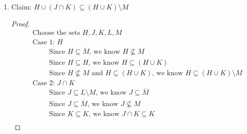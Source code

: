 \documentclass{article}
\begin{document}
\begin{enumerate}
\begin{enumerate}
\begin{proof}
\begin{align*}
                &5. \quad \hspace{1cm} \text{Since } X \nsubseteq Z \text{, we know } X \nsubseteq Y \cap Z \\
                &6. \quad \text{Since } X \nsubseteq Y \cap Z \text{, we know } X \subseteq \overline{Y \cap Z}
            \end{align*}
        \end{proof}
        \item Claim: $H \cup (J \cap K) \subseteq (H \cup K) \setminus M$
        \begin{proof}
            \begin{align}
                &\quad \text{Choose the sets } H, J, K, L, M \\
                &\quad \text{Case 1: } H \\
                &\quad \hspace{1cm} \text{Since } H \subseteq \overline{M} \text{, we know } H \nsubseteq M \\
                &\quad \hspace{1cm} \text{Since } H \subseteq H \text{, we know } H \subseteq (H \cup K) \\
                &\quad \hspace{1cm} \text{Since } H \nsubseteq M \text{ and } H \subseteq (H \cup K) \text{, we know } H \subseteq (H \cup K) \setminus M \\
                &\quad \text{Case 2: } J \cap K \\
                &\quad \hspace{1cm} \text{Since } J \subseteq L \setminus M \text{, we know } J \subseteq \overline{M} \\
                &\quad \hspace{1cm} \text{Since } J \subseteq \overline{M} \text{, we know } J \nsubseteq M \\
                &\quad \hspace{1cm} \text{Since } K \subseteq K \text{, we know } J \cap K \subseteq K \\

\end{align}
\end{proof}
\end{enumerate}
\end{enumerate}
\end{document}
